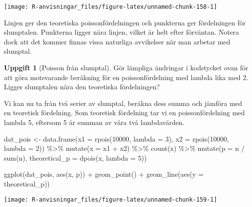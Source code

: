 \documentclass[
]{book}
\newenvironment{Shaded}{\begin{snugshade}}{\end{snugshade}}
\newcommand{\AttributeTok}[1]{\textcolor[rgb]{0.77,0.63,0.00}{#1}}
\newcommand{\DecValTok}[1]{\textcolor[rgb]{0.00,0.00,0.81}{#1}}
\newcommand{\FunctionTok}[1]{\textcolor[rgb]{0.00,0.00,0.00}{#1}}
\newcommand{\NormalTok}[1]{#1}
\newcommand{\OtherTok}[1]{\textcolor[rgb]{0.56,0.35,0.01}{#1}}
\newcommand{\SpecialCharTok}[1]{\textcolor[rgb]{0.00,0.00,0.00}{#1}}
\theoremstyle{definition}
\theoremstyle{definition}
\theoremstyle{definition}
\newtheorem{exercise}{Uppgift}[chapter]
\theoremstyle{definition}
\theoremstyle{remark}
\begin{document}
\begin{center}\texttt{[image: R-anvisningar\_files/figure-latex/unnamed-chunk-158-1]} \end{center}

Linjen ger den teoretiska poissonfördelningen och punkterna ger fördelningen för slumptalen. Punkterna ligger nära linjen, vilket är helt efter förväntan. Notera dock att det kommer finnas vissa naturliga avvikelser när man arbetar med slumptal.

\begin{exercise}[Poisson från slumptal]
Gör lämpliga ändringar i kodstycket ovan för att göra motsvarande beräkning för en poissonfördelning med lambda lika med 2. Ligger slumptalen nära den teoretiska fördelningen?
\end{exercise}

Vi kan nu ta från två serier av slumptal, beräkna dess summa och jämföra med en teoretisk fördelning. Som teoretisk fördelning tar vi en poissonfördelning med lambda 5, eftersom 5 är summan av våra två lambdavärden.

\begin{Shaded}
\begin{Highlighting}[]
\NormalTok{dat\_pois }\OtherTok{\textless{}{-}} \FunctionTok{data.frame}\NormalTok{(}\AttributeTok{x1 =} \FunctionTok{rpois}\NormalTok{(}\DecValTok{10000}\NormalTok{, }\AttributeTok{lambda =} \DecValTok{3}\NormalTok{),}
                       \AttributeTok{x2 =} \FunctionTok{rpois}\NormalTok{(}\DecValTok{10000}\NormalTok{, }\AttributeTok{lambda =} \DecValTok{2}\NormalTok{)) }\SpecialCharTok{\%\textgreater{}\%} 
  \FunctionTok{mutate}\NormalTok{(}\AttributeTok{x =}\NormalTok{ x1 }\SpecialCharTok{+}\NormalTok{ x2) }\SpecialCharTok{\%\textgreater{}\%} 
  \FunctionTok{count}\NormalTok{(x) }\SpecialCharTok{\%\textgreater{}\%} 
  \FunctionTok{mutate}\NormalTok{(}\AttributeTok{p =}\NormalTok{ n }\SpecialCharTok{/} \FunctionTok{sum}\NormalTok{(n),}
         \AttributeTok{theoretical\_p =} \FunctionTok{dpois}\NormalTok{(x, }\AttributeTok{lambda =} \DecValTok{5}\NormalTok{))}

\FunctionTok{ggplot}\NormalTok{(dat\_pois, }\FunctionTok{aes}\NormalTok{(x, p)) }\SpecialCharTok{+}
  \FunctionTok{geom\_point}\NormalTok{() }\SpecialCharTok{+}
  \FunctionTok{geom\_line}\NormalTok{(}\FunctionTok{aes}\NormalTok{(}\AttributeTok{y =}\NormalTok{ theoretical\_p))}
\end{Highlighting}
\end{Shaded}

\begin{center}\texttt{[image: R-anvisningar\_files/figure-latex/unnamed-chunk-159-1]} \end{center}
\end{document}
